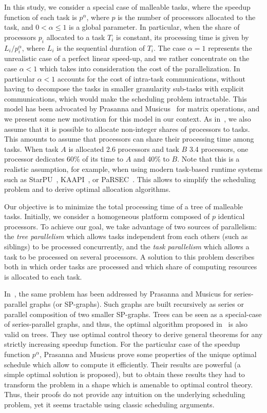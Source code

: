 \documentclass{llncs}
\begin{document}
In this study, we consider a special case of malleable tasks, where
the speedup function of each task is $p^\alpha$, where $p$ is the
number of processors allocated to the task, and $0<\alpha\leq 1$ is a
global parameter.  In particular, when the share of processors $p_i$
allocated to a task $T_i$ is constant, its processing time is given by
$L_i/ p_i^\alpha$, where $L_i$ is the sequential duration of
$T_i$. The case $\alpha=1$ represents the unrealistic case of a
perfect linear speed-up, and we rather concentrate on the case
$\alpha<1$ which takes into consideration the cost of the
parallelization. In particular $\alpha<1$ accounts for the cost of
intra-task communications, without having to decompose the tasks in
smaller granularity sub-tasks with explicit communications, which
would make the scheduling problem intractable. This model has been
advocated by Prasanna and Musicus~\cite{prasmus2} for matrix
operations, and we present some new motivation for this model in our
context. As in~\cite{prasmus2}, we also assume that it is possible to
allocate non-integer shares of processors to tasks. This amounts to
assume that processors can share their processing time among
tasks. When task $A$ is allocated 2.6 processors and task $B$ 3.4
processors, one processor dedicates 60\% of its time to $A$ and 40\%
to $B$. Note that this is a realistic assumption, for example, when
using modern task-based runtime systems such as StarPU~\cite{starpu},
KAAPI~\cite{kaapi}, or PaRSEC~\cite{parsec}. This allows to simplify
the scheduling problem and to derive optimal allocation algorithms.

Our objective is to minimize the total processing time of a tree of
malleable tasks. Initially, we consider a homogeneous platform
composed of $p$ identical processors. To achieve our goal, we take
advantage of two sources of parallelism: the \emph{tree parallelism}
which allows tasks independent from each others (such as siblings) to
be processed concurrently, and the \emph{task parallelism} which
allows a task to be processed on several processors. A solution to
this problem describes both in which order tasks are processed and
which share of computing resources is allocated to each task.

In~\cite{prasmus,prasmus2}, the same problem has been addressed by
Prasanna and Musicus for series-parallel graphs (or SP-graphs). Such
graphs are built recursively as series or parallel composition of two
smaller SP-graphs. Trees can be seen as a special-case of
series-parallel graphs, and thus, the optimal algorithm proposed
in~\cite{prasmus,prasmus2} is also valid on trees. They use optimal
control theory to derive general theorems for any strictly increasing
speedup function. For the particular case of the speedup function
$p^\alpha$, Prasanna and Musicus prove some properties of the unique
optimal schedule which allow to compute it efficiently. Their results
are powerful (a simple optimal solution is proposed), but to obtain
these results they had to transform the problem in a shape which is
amenable to optimal control theory. Thus, their proofs do not provide
any intuition on the underlying scheduling problem, yet it seems
tractable using classic scheduling arguments.
\end{document}
